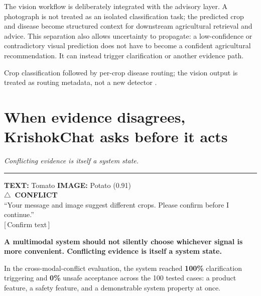 \documentclass[11pt,a4paper]{article}
\newcommand{\takeaway}[1]{{\color{kcgrey}\itshape\large #1}\par\vspace{2pt}%
  {\color{kcline}\rule{\linewidth}{0.8pt}}\par\vspace{6pt}}
\newcommand{\srcfoot}[1]{\par\vspace{4pt}{\color{kcline}\rule{\linewidth}{0.4pt}}\par
  {\footnotesize\color{kcgrey}#1}\par}
\begin{document}
\vspace{3pt}
The vision workflow is deliberately integrated with the advisory layer. A
photograph is not treated as an isolated classification task; the predicted crop
and disease become structured context for downstream agricultural retrieval and
advice. This separation also allows uncertainty to propagate: a low-confidence or
contradictory visual prediction does not have to become a confident agricultural
recommendation. It can instead trigger clarification or another evidence path.

\srcfoot{Crop classification followed by per-crop disease routing; the vision output is treated as routing metadata, not a new detector \cite{krishokchat_repo,cea_manuscript}.}

\newpage
\section*{\color{kcgreen}When evidence disagrees, KrishokChat asks before it acts}
\takeaway{Conflicting evidence is itself a system state.}

\begin{center}
\begin{tcolorbox}[colback=kcamber!12,colframe=kcearth,width=0.8\linewidth,arc=3pt]
\centering\footnotesize
\textbf{TEXT:} Tomato \qquad\qquad \textbf{IMAGE:} Potato (0.91)\\[6pt]
{\large\bfseries\color{kcred}$\triangle$\ CONFLICT}\\[6pt]
``Your message and image suggest different crops. Please confirm before I continue.''\\[6pt]
{\footnotesize [\,Confirm text\,]}
\end{tcolorbox}
\end{center}

\vspace{3pt}
\begin{pullquote}
{\bfseries\color{kcgreen}A multimodal system should not silently choose whichever signal is more convenient. Conflicting evidence is itself a system state.}
\end{pullquote}

\vspace{3pt}
In the cross-modal-conflict evaluation, the system reached \textbf{100\%}
clarification triggering and \textbf{0\%} unsafe acceptance across the 100 tested
cases: a product feature, a safety feature, and a demonstrable system property at
once.
\end{document}

